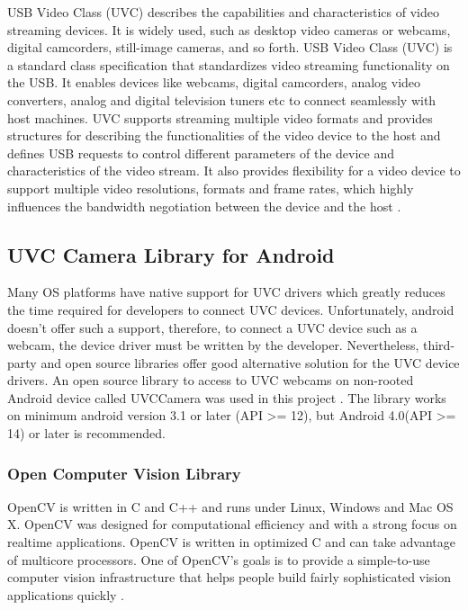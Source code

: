 USB Video Class (UVC) describes the capabilities and characteristics of video streaming devices. It is widely used, such as desktop video cameras or webcams, digital camcorders, still-image cameras, and so forth. USB Video Class (UVC) is a standard class specification that standardizes video streaming functionality on the USB. It enables devices like webcams, digital camcorders, analog video converters, analog and digital television tuners etc to connect seamlessly with host machines. UVC supports streaming multiple video formats and provides structures for describing the functionalities of the video device to the host and defines USB requests to control different parameters of the device and characteristics of the video stream. It also provides flexibility for a video device to support multiple video resolutions, formats and frame rates, which highly influences the bandwidth negotiation between the device and the host \parencite{uvc}.

\subsection{UVC Camera Library for Android}
Many OS platforms have native support for UVC drivers which greatly reduces the time required for developers to connect UVC devices. Unfortunately, android doesn’t offer such a support, therefore, to connect a UVC device such as a webcam, the device driver must be written by the developer. 
Nevertheless, third-party and open source libraries offer good alternative solution for the UVC device drivers. An open source library to access to UVC webcams on non-rooted Android device called UVCCamera was used in this project \parencite{uvcCamera}. The library works on minimum android version 3.1 or later (API >= 12), but Android 4.0(API >= 14) or later is recommended.


\subsubsection{Open Computer Vision Library}
OpenCV is written in C and C++ and runs under Linux, Windows and Mac OS X. OpenCV was designed for computational efficiency and with a strong focus on realtime applications. OpenCV is written in optimized C and can take advantage of multicore processors. One of OpenCV’s goals is to provide a simple-to-use computer vision infrastructure that helps people build fairly sophisticated vision applications quickly \parencite{openCv}.




